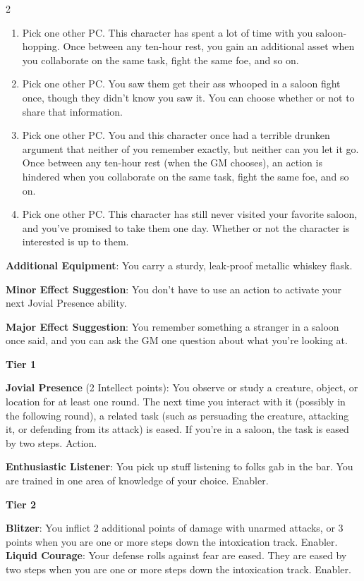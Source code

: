 \begin{multicols}{2}
\begin{enumerate}
\item Pick one other PC. This character has spent a lot of time with you saloon-hopping. Once between any ten-hour rest, you gain an additional asset when you collaborate on the same task, fight the same foe, and so on. 
\item Pick one other PC. You saw them get their ass whooped in a saloon fight once, though they didn’t know you saw it. You can choose whether or not to share that information. 
\item Pick one other PC. You and this character once had a terrible drunken argument that neither of you remember exactly, but neither can you let it go. Once between any ten-hour rest (when the GM chooses), an action is hindered when you collaborate on the same task, fight the same foe, and so on. 
\item Pick one other PC. This character has still never visited your favorite saloon, and you’ve promised to take them one day. Whether or not the character is interested is up to them.
\end{enumerate}

\textbf{Additional Equipment}: You carry a sturdy, leak‑proof metallic whiskey flask. 

\textbf{Minor Effect Suggestion}: You don’t have to use an action to activate your next Jovial Presence ability.

\textbf{Major Effect Suggestion}: You remember something a stranger in a saloon once said, and you can ask the GM one question about what you’re looking at.

\textbf{Tier 1} 

\textbf{Jovial Presence} (2 Intellect points): You observe or study a creature, object, or location for at least one round. The next time you interact with it (possibly in the following round), a related task (such as persuading the creature, attacking it, or defending from its attack) is eased. If you’re in a saloon, the task is eased by two steps. Action. 

\textbf{Enthusiastic Listener}: You pick up stuff listening to folks gab in the bar. You are trained in one area of knowledge of your choice. Enabler. 

\textbf{Tier 2} 

\textbf{Blitzer}: You inflict 2 additional points of damage with unarmed attacks, or 3 points when you are one or more steps down the intoxication track. Enabler. 
\textbf{Liquid Courage}: Your defense rolls against fear are eased. They are eased by two steps when you are one or more steps down the intoxication track. Enabler. 


\end{multicols}
